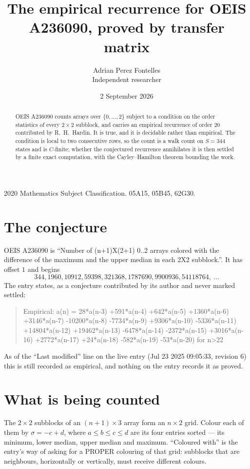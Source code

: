 \documentclass[11pt,a4paper]{article}
\title{The empirical recurrence for OEIS A236090, proved by transfer matrix}
\author{Adrian Perez Fontelles\\ \small Independent researcher}
\date{2 September 2026}
\theoremstyle{plain}
\theoremstyle{definition}
\begin{document}
\maketitle

\begin{abstract}
OEIS A236090 counts arrays over $\{0,\dots,2\}$ subject to a condition on the order
statistics of every $2\times2$ subblock, and carries an empirical recurrence of order
$20$ contributed by R.~H.~Hardin. It is true, and it is decidable rather than empirical.
The condition is local to two consecutive rows, so the count is a walk count on $S=344$
states and is $C$-finite; whether the conjectured recurrence annihilates it is then settled by
a finite exact computation, with the Cayley--Hamilton theorem bounding the work.
\end{abstract}

\noindent\small 2020 Mathematics Subject Classification. 05A15, 05B45, 62G30.\normalsize

\section{The conjecture}

OEIS A236090 is ``Number of (n+1)X(2+1) 0..2 arrays colored with the difference of the maximum and the upper median in each 2X2 subblock.''. It has offset $1$ and begins
\[
344, 1960, 10912, 59398, 321368, 1787690, 9900936, 54118764,\ \dots
\]
The entry states, as a conjecture contributed by its author and never marked settled:
\begin{quote}
Empirical: a(n) = 28*a(n-3) +591*a(n-4) +642*a(n-5) +1360*a(n-6) +3146*a(n-7) -10200*a(n-8) -7734*a(n-9) +9306*a(n-10) -5336*a(n-11) +14804*a(n-12) +19462*a(n-13) -6478*a(n-14) -2372*a(n-15) +3016*a(n-16) +2772*a(n-17) +24*a(n-18) -582*a(n-19) -53*a(n-20) for n>22
\end{quote}
As of the ``Last modified'' line on the live entry (Jul 23 2025 09:05:33, revision 6) this is still
recorded as empirical, and nothing on the entry records it as proved.

\section{What is being counted}

The $2\times2$ subblocks of an $(n+1)\times3$ array form an
$n\times2$ grid. Colour each of them by $\sigma=-c+d$, where $a\le b\le c\le d$ are its four entries sorted --- its minimum, lower median, upper median and maximum. ``Coloured with'' is the entry's way of
asking for a PROPER colouring of that grid: subblocks that are neighbours, horizontally or
vertically, must receive different colours.
\end{document}
